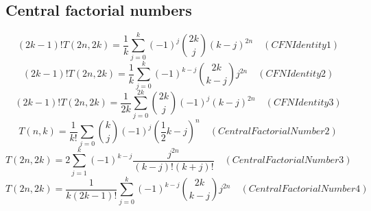 \subsection{Central factorial numbers}\label{subsec:central-factorial-numbers}

\begin{equation*}
(2k-1)
    !T(2n,2k) = \frac{1}{k} \sum_{j=0}^{k} (-1)^j \binom{2k}{j} (k-j)^{2n} \quad
    (CFNIdentity1)
\end{equation*}
\begin{equation*}
(2k-1)
    !T(2n,2k) = \frac{1}{k} \sum_{j=0}^{k} (-1)^{k-j} \binom{2k}{k-j} j^{2n} \quad
    (CFNIdentity2)
\end{equation*}
\begin{equation*}
(2k-1)
    !T(2n, 2k) = \frac{1}{2k} \sum_{j=0}^{2k} \binom{2k}{j} (-1)^{j} (k-j)^{2n} \quad
    (CFNIdentity3)
\end{equation*}
\begin{equation*}
    T(n,k) = \frac{1}{k!} \sum_{j=0} \binom{k}{j} (-1)^{j} \left( \frac{1}{2}k - j \right)^{n} \quad
    (CentralFactorialNumber2)
\end{equation*}
\begin{equation*}
    T(2n,2k) = 2 \sum_{j=1}^{k} (-1)^{k-j} \frac{j^{2n}}{(k-j)! (k+j)!} \quad
    (CentralFactorialNumber3)
\end{equation*}
\begin{equation*}
T(2n,2k) = \frac{1}{k (2k-1)!} \sum_{j=0}^{k} (-1)^{k-j} \binom{2k}{k-j} j^{2n} \quad
    (CentralFactorialNumber4)
\end{equation*}